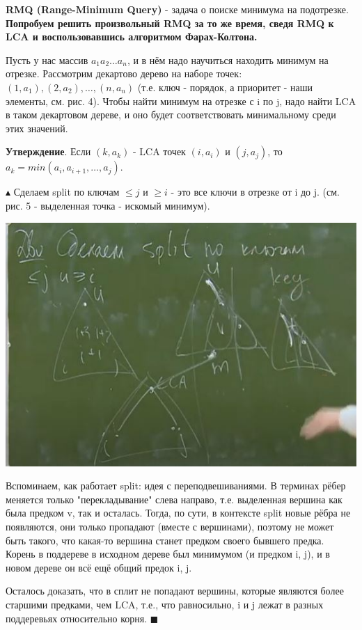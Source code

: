 \textbf{RMQ (Range-Minimum Query)} - задача о поиске минимума на подотрезке. \textbf{Попробуем решить произвольный RMQ за то же время, сведя RMQ к LCA и воспользовавшись алгоритмом Фарах-Колтона.}

Пусть у нас массив $a_1a_2 \dots a_n$, и в нём надо научиться находить минимум на отрезке. Рассмотрим декартово дерево на наборе точек: $(1, a_1), (2, a_2), \dots, (n, a_n)$ (т.е. ключ - порядок, а приоритет - наши элементы, см. рис. 4). Чтобы найти минимум на отрезке с i по j, надо найти LCA в таком декартовом дереве, и оно будет соответствовать минимальному среди этих значений. 

\textbf{Утверждение}. Если $(k, a_k)$ - LCA точек $(i, a_i)$ и $(j, a_j)$, то $a_k = min(a_i, a_{i+1}, \dots, a_j)$.

$\blacktriangle$
Сделаем split по ключам $\leqslant j$ и $\geqslant i$ - это все ключи в отрезке от i до j. (см. рис. 5 - выделенная точка - искомый минимум). 

\includegraphics[]{images/96-99_split}

Вспоминаем, как работает split: идея с переподвешиваниями. В терминах рёбер меняется только "перекладывание" слева направо, т.е. выделенная вершина как была предком v, так и осталась. Тогда, по сути, в контексте split новые рёбра не появляются, они только пропадают (вместе с вершинами), поэтому не может быть такого, что какая-то вершина станет предком своего бывшего предка. Корень в поддереве в исходном дереве был минимумом (и предком i, j), и в новом дереве он всё ещё общий предок i, j.

Осталось доказать, что в сплит не попадают вершины, которые являются более старшими предками, чем LCA, т.е., что равносильно, i и j лежат в разных поддеревьях относительно корня.
$\blacksquare$


